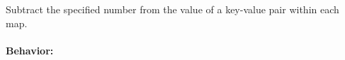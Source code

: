 Subtract the specified number from the value of a key-value pair within each
map.

\paragraph{Behavior:}
\begin{itemize}[noitemsep]


\end{itemize}
